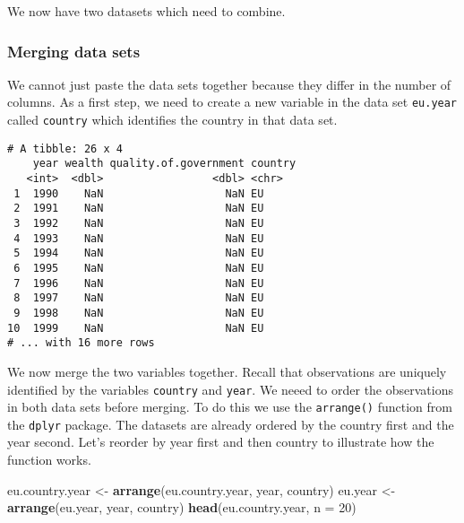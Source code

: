 \documentclass[]{article}
\newenvironment{Shaded}{\begin{snugshade}}{\end{snugshade}}
\newcommand{\DataTypeTok}[1]{\textcolor[rgb]{0.13,0.29,0.53}{#1}}
\newcommand{\DecValTok}[1]{\textcolor[rgb]{0.00,0.00,0.81}{#1}}
\newcommand{\KeywordTok}[1]{\textcolor[rgb]{0.13,0.29,0.53}{\textbf{#1}}}
\newcommand{\NormalTok}[1]{#1}
\newcommand{\OperatorTok}[1]{\textcolor[rgb]{0.81,0.36,0.00}{\textbf{#1}}}
\newcommand{\StringTok}[1]{\textcolor[rgb]{0.31,0.60,0.02}{#1}}
\begin{document}
We now have two datasets which need to combine.

\hypertarget{merging-data-sets}{%
\subsubsection{Merging data sets}\label{merging-data-sets}}

We cannot just paste the data sets together because they differ in the number of columns. As a first step, we need to create a new variable in the data set \texttt{eu.year} called \texttt{country} which identifies the country in that data set.

\begin{Shaded}
\end{Shaded}

\begin{verbatim}
# A tibble: 26 x 4
    year wealth quality.of.government country
   <int>  <dbl>                 <dbl> <chr>  
 1  1990    NaN                   NaN EU     
 2  1991    NaN                   NaN EU     
 3  1992    NaN                   NaN EU     
 4  1993    NaN                   NaN EU     
 5  1994    NaN                   NaN EU     
 6  1995    NaN                   NaN EU     
 7  1996    NaN                   NaN EU     
 8  1997    NaN                   NaN EU     
 9  1998    NaN                   NaN EU     
10  1999    NaN                   NaN EU     
# ... with 16 more rows
\end{verbatim}

We now merge the two variables together. Recall that observations are uniquely identified by the variables \texttt{country} and \texttt{year}. We neeed to order the observations in both data sets before merging. To do this we use the \texttt{arrange()} function from the \texttt{dplyr} package. The datasets are already ordered by the country first and the year second. Let's reorder by year first and then country to illustrate how the function works.

\begin{Shaded}
\begin{Highlighting}[]
\NormalTok{eu.country.year <-}\StringTok{ }\KeywordTok{arrange}\NormalTok{(eu.country.year, year, country)}
\NormalTok{eu.year <-}\StringTok{ }\KeywordTok{arrange}\NormalTok{(eu.year, year, country)}
\KeywordTok{head}\NormalTok{(eu.country.year, }\DataTypeTok{n =} \DecValTok{20}\NormalTok{)}
\end{Highlighting}
\end{Shaded}
\end{document}
